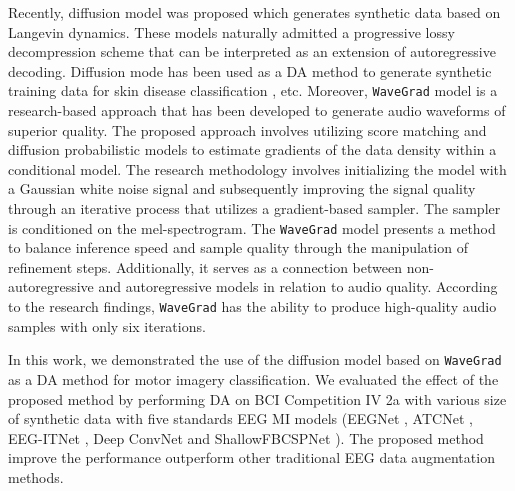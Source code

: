 \documentclass[runningheads]{llncs}
\begin{document}
Recently, diffusion model \cite{ho2020denoising} was proposed which generates synthetic data based on Langevin dynamics. These models naturally admitted a progressive lossy decompression scheme that can be interpreted as an extension of autoregressive decoding. 
Diffusion mode has been used as a DA method to generate synthetic training data for skin disease classification \cite{akrout2023diffusion}, etc.   
Moreover, \texttt{WaveGrad} \cite{chen2020WaveGrad} model is a research-based approach that has been developed to generate audio waveforms of superior quality. The proposed approach involves utilizing score matching \cite{song2020sliced} and diffusion probabilistic models to estimate gradients of the data density within a conditional model. The research methodology involves initializing the model with a Gaussian white noise signal and subsequently improving the signal quality through an iterative process that utilizes a gradient-based sampler. The sampler is conditioned on the mel-spectrogram. The \texttt{WaveGrad} model presents a method to balance inference speed and sample quality through the manipulation of refinement steps. Additionally, it serves as a connection between non-autoregressive and autoregressive models in relation to audio quality. According to the research findings, \texttt{WaveGrad} has the ability to produce high-quality audio samples with only six iterations.

In this work,  we demonstrated the use of the diffusion model based on \texttt{WaveGrad} \cite{chen2020WaveGrad} as a DA method for motor imagery classification.  We evaluated the effect of the proposed method by performing DA on BCI Competition IV 2a \cite{brunner2008bci} with various size of synthetic data with five standards EEG MI models (EEGNet \cite{lawhern2018eegnet}, ATCNet \cite{altaheri2022physics}, EEG-ITNet \cite{salami2022eeg}, Deep ConvNet \cite{schirrmeister2017deep} and ShallowFBCSPNet \cite{schirrmeister2017deep}). The proposed method improve the performance outperform other traditional EEG data augmentation methods. 
\end{document}
